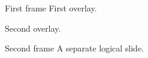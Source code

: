 \documentclass[aspectratio=169]{beamer}
\begin{document}
\begin{frame}{First frame}
First overlay.\pause\par Second overlay.
\end{frame}
\begin{frame}{Second frame}
A separate logical slide.
\end{frame}
\end{document}
